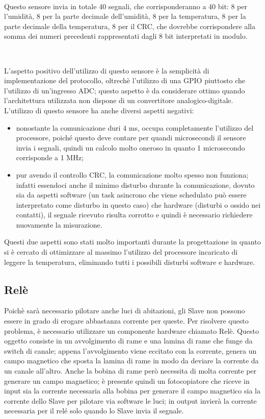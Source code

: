 \documentclass[a4paper,titlepage]{book}
\newcommand{\itema}{\begin{itemize}[noitemsep,topsep=10pt,parsep=5pt,partopsep=10pt]}
\begin{document}
~

Questo sensore invia in totale 40 segnali, che corrisponderanno a 40 bit: 8 per l'umidità, 8 per la parte decimale dell'umidità, 8 per la temperatura, 8 per la parte decimale della temperatura, 8 per il CRC, che dovrebbe corrispondere alla somma dei numeri precedenti rappresentati dagli 8 bit interpretati in modulo.

~

L'aspetto positivo dell'utilizzo di questo sensore è la semplicità di implementazione del protocollo, oltrechè l'utilizzo di una GPIO piuttosto che l'utilizzo di un'ingresso ADC; questo aspetto è da considerare ottimo quando l'architettura utilizzata non dispone di un convertitore analogico-digitale. L'utilizzo di questo sensore ha anche diversi aspetti negativi:

\itema

\item nonostante la comunicazione duri 4 ms, occupa completamente l'utilizzo del processore, poiché questo deve contare per quandi microsecondi il sensore invia i segnali, quindi un calcolo molto oneroso in quanto 1 microsecondo corrisponde a 1 MHz;

\item pur avendo il controllo CRC, la comunicazione molto spesso non funziona; infatti essendoci anche il minimo disturbo durante la comunicazione, dovuto sia da aspetti software (un task asincrono che viene schedulato può essere interpretato come disturbo in questo caso) che hardware (disturbi o ossido nei contatti), il segnale ricevuto risulta corrotto e quindi è necessario richiedere nuovamente la misurazione. 

\end{itemize}

Questi due aspetti sono stati molto importanti durante la progettazione in quanto si è cercato di ottimizzare al massimo l'utilizzo del processore incaricato di leggere la temperatura, eliminando tutti i possibili disturbi software e hardware.

\subsection{Relè}

Poichè sarà necessario pilotare anche luci di abitazioni, gli Slave non possono essere in grado di erogare abbastanza corrente per queste. Per risolvere questo problema, è necessario utilizzare un componente hardware chiamato Relè. Questo oggetto consiste in un avvolgimento di rame e una lamina di rame che funge da switch di canale; appena l'avvolgimento viene eccitato con la corrente, genera un campo magnetico che sposta la lamina di rame in modo da deviare la corrente da un canale all'altro. Anche la bobina di rame però necessita di molta corrente per generare un campo magnetico; è presente quindi un fotocopiatore che riceve in input sia la corrente necessaria alla bobina per generare il campo magnetico sia la corrente dello Slave per pilotare via software le luci; in output invierà la corrente necessaria per il relé solo quando lo Slave invia il segnale.
\end{document}
